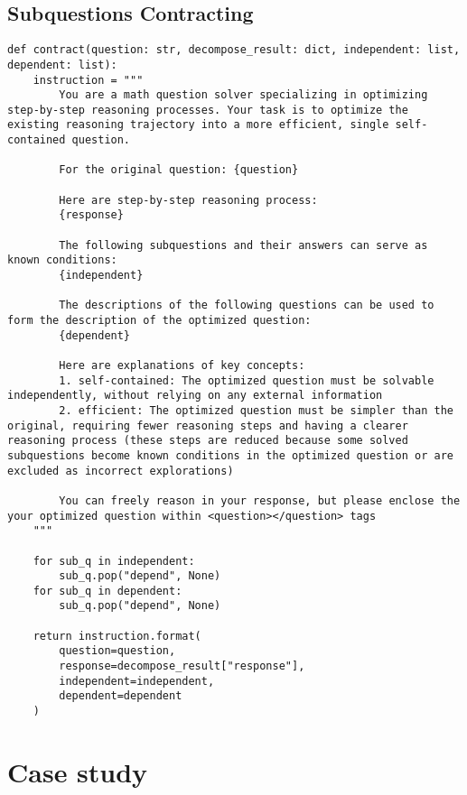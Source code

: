 \subsection{Subquestions Contracting}
\label{appendix:contract}
\begin{lstlisting}[style=PythonStyle, caption={Subquestions Contracting Prompt Template}]
def contract(question: str, decompose_result: dict, independent: list, dependent: list):
    instruction = """
        You are a math question solver specializing in optimizing step-by-step reasoning processes. Your task is to optimize the existing reasoning trajectory into a more efficient, single self-contained question.
        
        For the original question: {question}
        
        Here are step-by-step reasoning process:
        {response}
        
        The following subquestions and their answers can serve as known conditions:
        {independent}

        The descriptions of the following questions can be used to form the description of the optimized question:
        {dependent}
        
        Here are explanations of key concepts:
        1. self-contained: The optimized question must be solvable independently, without relying on any external information
        2. efficient: The optimized question must be simpler than the original, requiring fewer reasoning steps and having a clearer reasoning process (these steps are reduced because some solved subquestions become known conditions in the optimized question or are excluded as incorrect explorations)
        
        You can freely reason in your response, but please enclose the your optimized question within <question></question> tags
    """
    
    for sub_q in independent:
        sub_q.pop("depend", None)
    for sub_q in dependent:
        sub_q.pop("depend", None)
        
    return instruction.format(
        question=question,
        response=decompose_result["response"],
        independent=independent,
        dependent=dependent
    )
\end{lstlisting}


\section{Case study}

